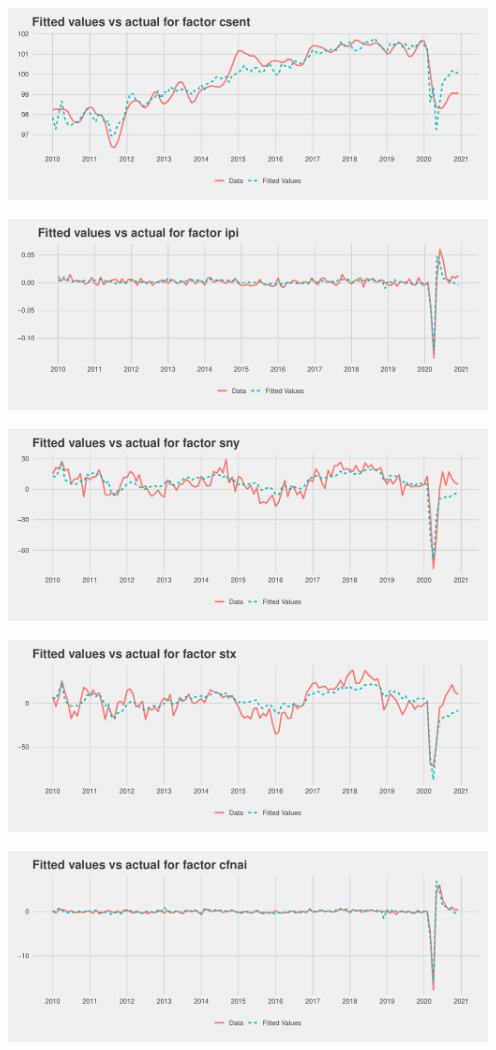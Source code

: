 \documentclass[11pt, letterpaper]{article}\usepackage[]{graphicx}\usepackage[]{color}
\begin{document}
{\centering \includegraphics[width=5in,height=2in]{figure/unnamed-chunk-20-23} 

}




{\centering \includegraphics[width=5in,height=2in]{figure/unnamed-chunk-20-24} 

}




{\centering \includegraphics[width=5in,height=2in]{figure/unnamed-chunk-20-25} 

}




{\centering \includegraphics[width=5in,height=2in]{figure/unnamed-chunk-20-26} 

}




{\centering \includegraphics[width=5in,height=2in]{figure/unnamed-chunk-20-27} 

}
\end{document}
